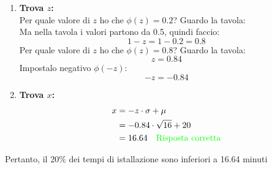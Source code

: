 \documentclass{article}  %
\theoremstyle{definition}
\begin{document}
\begin{esempio}
\begin{esercizio}
\begin{itemize}
			      \begin{enumerate}
				      \item \textbf{Trova $z$:} \\
				            Per quale valore di $z$ ho che $\phi(z)=0.2$? Guardo la tavola: \\
				            Ma nella tavola i valori partono da 0.5, quindi faccio:
				            \[
					            1-z=1-0.2=0.8
				            \]
				            Per quale valore di $z$ ho che $\phi(z)=0.8$? Guardo la tavola: \\
				            \[
					            z=0.84
				            \]
				            Impostalo negativo $\phi(-z)$:
				            \[
					            -z=-0.84
				            \]
				      \item \textbf{Trova $x$:}
				            \begin{align*}
					            x
					             & = -z\cdot \sigma + \mu                                    \\
					             & = -0.84 \cdot \sqrt{16}+20                                \\
					             & = 16.64 \quad \textcolor{green}{\text{Risposta corretta}}
				            \end{align*}
			      \end{enumerate}
			      Pertanto, il 20$\%$ dei tempi di istallazione sono inferiori a 16.64 minuti
		\end{itemize}

	\end{esercizio}
\end{esempio}
\newpage
\end{document}
